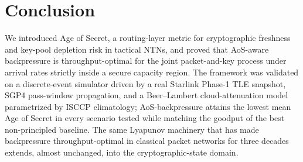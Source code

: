 \documentclass[conference]{IEEEtran}
\begin{document}
\section{Conclusion}
We introduced Age of Secret, a routing-layer metric for cryptographic
freshness and key-pool depletion risk in tactical NTNs, and proved
that AoS-aware backpressure is throughput-optimal for the joint
packet-and-key process under arrival rates strictly inside a secure
capacity region.  The framework was validated on a discrete-event
simulator driven by a real Starlink Phase-1 TLE snapshot, SGP4
pass-window propagation, and a Beer--Lambert cloud-attenuation model
parametrized by ISCCP climatology; AoS-backpressure attains the
lowest mean Age of Secret in every scenario tested while matching the
goodput of the best non-principled baseline.  The same Lyapunov
machinery that has made backpressure throughput-optimal in classical
packet networks for three decades extends, almost unchanged, into the
cryptographic-state domain.

\balance


\end{document}

